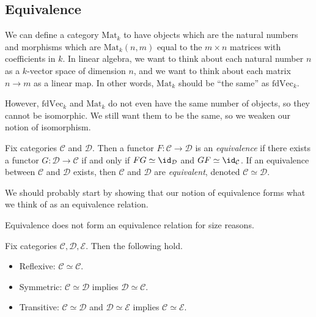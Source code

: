 \documentclass[../notes.tex]{subfiles}
\begin{document}

\subsection{Equivalence}
We can define a category $\mathrm{Mat}_k$ to have objects which are the natural numbers and morphisms which are $\mathrm{Mat}_k(n,m)$ equal to the $m\times n$ matrices with coefficients in $k$. In linear algebra, we want to think about each natural number $n$ as a $k$-vector space of dimension $n$, and we want to think about each matrix $n\to m$ as a linear map. In other words, $\mathrm{Mat}_k$ should be ``the same'' as $\mathrm{fdVec}_k$.

However, $\mathrm{fdVec}_k$ and $\mathrm{Mat}_k$ do not even have the same number of objects, so they cannot be isomorphic. We still want them to be the same, so we weaken our notion of isomorphism.
\begin{defi}[Equivalence]
	Fix categories $\mathcal C$ and $\mathcal D$. Then a functor $F:\mathcal C\to\mathcal D$ is an \textit{equivalence} if there exists a functor $G:\mathcal D\to\mathcal C$ if and only if $FG\simeq\id_\mathcal D$ and $GF\simeq\id_\mathcal C$. If an equivalence between $\mathcal C$ and $\mathcal D$ exists, then $\mathcal C$ and $\mathcal D$ are \textit{equivalent}, denoted $\mathcal C\simeq\mathcal D$.
\end{defi}
We should probably start by showing that our notion of equivalence forms what we think of as an equivalence relation.
\begin{remark}[Bryce]
	Equivalence does not form an equivalence relation for size reasons.
\end{remark}
\begin{lemma}
	Fix categories $\mathcal C,\mathcal D,\mathcal E$. Then the following hold.
	\begin{itemize}
		\item Reflexive: $\mathcal C\simeq\mathcal C$.
		\item Symmetric: $\mathcal C\simeq\mathcal D$ implies $\mathcal D\simeq\mathcal C$.
		\item Transitive: $\mathcal C\simeq\mathcal D$ and $\mathcal D\simeq\mathcal E$ implies $\mathcal C\simeq\mathcal E$.
	\end{itemize}
\end{lemma}
\end{document}
